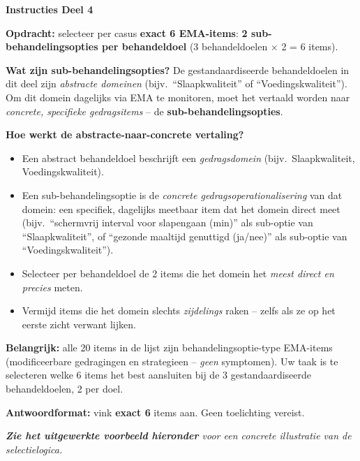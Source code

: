 \documentclass[11pt,a4paper]{article}
\begin{document}
\begin{tcolorbox}[colback=purple!4,colframe=RichPurple,arc=2.5mm,boxrule=0.9pt,
  left=10pt,right=10pt,top=9pt,bottom=9pt]
\textbf{\color{RichPurple}Instructies Deel 4}

\smallskip\small
\textbf{Opdracht:} selecteer per casus \textbf{exact 6 EMA-items}:
\textbf{2 sub-behandelingsopties per behandeldoel} (3 behandeldoelen $\times$ 2 = 6 items).

\textbf{Wat zijn sub-behandelingsopties?}
De gestandaardiseerde behandeldoelen in dit deel zijn \emph{abstracte domeinen}
(bijv.\ ``Slaapkwaliteit'' of ``Voedingskwaliteit'').
Om dit domein dagelijks via EMA te monitoren, moet het vertaald worden naar
\emph{concrete, specifieke gedragsitems} -- de \textbf{sub-behandelingsopties}.

\textbf{Hoe werkt de abstracte-naar-concrete vertaling?}
\begin{itemize}[topsep=2pt,itemsep=1pt]
\item Een abstract behandeldoel beschrijft een \emph{gedragsdomein} (bijv.\ Slaapkwaliteit, Voedingskwaliteit).
\item Een sub-behandelingsoptie is de \emph{concrete gedragsoperationalisering} van dat domein: een specifiek, dagelijks meetbaar item dat het domein direct meet (bijv.\ ``schermvrij interval voor slapengaan (min)'' als sub-optie van ``Slaapkwaliteit'', of ``gezonde maaltijd genuttigd (ja/nee)'' als sub-optie van ``Voedingskwaliteit'').
\item Selecteer per behandeldoel de 2 items die het domein het \emph{meest direct en precies} meten.
\item Vermijd items die het domein slechts \emph{zijdelings} raken -- zelfs als ze op het eerste zicht verwant lijken.
\end{itemize}

\textbf{Belangrijk:} alle 20 items in de lijst zijn behandelingsoptie-type EMA-items
(modificeerbare gedragingen en strategieen -- \emph{geen} symptomen).
Uw taak is te selecteren welke 6 items het best aansluiten bij de 3 gestandaardiseerde
behandeldoelen, 2 per doel.

\textbf{Antwoordformat:} vink \textbf{exact 6} items aan. Geen toelichting vereist.

\medskip
\textit{\textbf{Zie het uitgewerkte voorbeeld hieronder} voor een concrete illustratie van de selectielogica.}
\end{tcolorbox}

\vspace{0.5em}
\nopagebreak[4]
\end{document}
